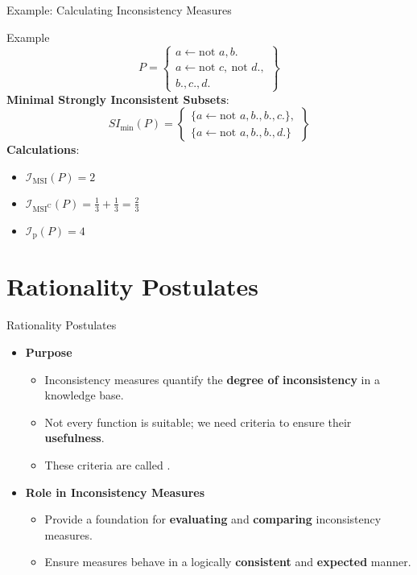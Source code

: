 \begin{frame}{Example: Calculating Inconsistency Measures}
    \begin{exampleblock}{Example}
        \[
            P = \left\{ \begin{array}{l}
                a \leftarrow \text{not }a, b.              \\
                a \leftarrow \text{not }c,\ \text{not }d., \\
                b., c., d.
            \end{array} \right\}
        \]
        \textbf{Minimal Strongly Inconsistent Subsets}:
        \[
            SI_{\min}(P) = \left\{ \begin{array}{l}
                \{ a \leftarrow \text{not }a, b., b., c. \}, \\
                \{ a \leftarrow \text{not }a, b., b., d. \}
            \end{array} \right\}
        \]
        \textbf{Calculations}:
        \begin{itemize}
            \item \( \mathcal{I}_{\text{MSI}}(P) = 2 \)
            \item \( \mathcal{I}_{\text{MSI}^\text{C}}(P) = \frac{1}{3} + \frac{1}{3} = \frac{2}{3} \)
            \item \( \mathcal{I}_{\text{p}}(P) = 4 \)
        \end{itemize}
    \end{exampleblock}
\end{frame}

\section{Rationality Postulates}

\begin{frame}{Rationality Postulates}
    \begin{itemize}
        \item \textbf{Purpose}
              \begin{itemize}
                  \item Inconsistency measures quantify the \textbf{degree of inconsistency} in a knowledge base.
                  \item Not every function is suitable; we need criteria to ensure their \textbf{usefulness}.
                  \item These criteria are called .
              \end{itemize}
        \item \textbf{Role in Inconsistency Measures}
              \begin{itemize}
                  \item Provide a foundation for \textbf{evaluating} and \textbf{comparing} inconsistency measures.
                  \item Ensure measures behave in a logically \textbf{consistent} and \textbf{expected} manner.
              \end{itemize}
    \end{itemize}
\end{frame}

